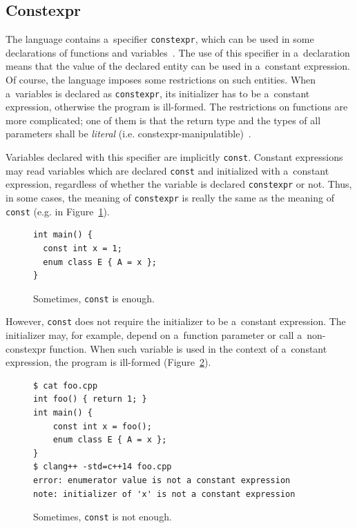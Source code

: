 \documentclass[nolot,nolof,nocover,printed]{fithesis3}
\newcommand{\stdN}[2]{\cite[#2]{#1}\xspace}
\begin{document}
\subsection{Constexpr}

The language contains a~specifier \lstinline|constexpr|, which can be used in some declarations of functions and variables~\stdN{n4296}{\S 7.1.5}. The use of this specifier in a~declaration means that the value of the declared entity can be used in a~constant expression. Of course, the language imposes some restrictions on such entities. When a~variables is declared as \lstinline|constexpr|, its initializer has to be a~constant expression, otherwise the program is ill-formed. The restrictions on functions are more complicated; one of them is that the return type and the types of all parameters shall be \textit{literal} (i.e. constexpr-manipulatible)~\stdN{n4296}{\S 7.1.5/3}.

Variables declared with this specifier are implicitly \lstinline|const|. Constant expressions may read variables which are declared \lstinline|const| and initialized with a~constant expression, regardless of whether the variable is declared \lstinline|constexpr| or not. Thus, in some cases, the meaning of \lstinline|constexpr| is really the same as the meaning of \lstinline|const| (e.g. in Figure~\ref{fig:constMayBeEnough}).

\begin{figure}[ht]
\begin{lstlisting}
int main() {
  const int x = 1;
  enum class E { A = x };
} 
\end{lstlisting}
\caption{Sometimes, \lstinline|const| is enough.}
\label{fig:constMayBeEnough}
\end{figure}

However, \lstinline|const| does not require the initializer to be a~constant expression. The initializer may, for example, depend on a~function parameter or call a~non-constexpr function. When such variable is used in the context of a~constant expression, the program is ill-formed (Figure~\ref{fig:constIsNotEnough}).

\begin{figure}[ht]
\begin{lstlisting}
$ cat foo.cpp
int foo() { return 1; }
int main() {
    const int x = foo();
    enum class E { A = x };
}
$ clang++ -std=c++14 foo.cpp
error: enumerator value is not a constant expression
note: initializer of 'x' is not a constant expression
\end{lstlisting}
\caption{Sometimes, \lstinline|const| is not enough.}
\label{fig:constIsNotEnough}
\end{figure}
\end{document}
